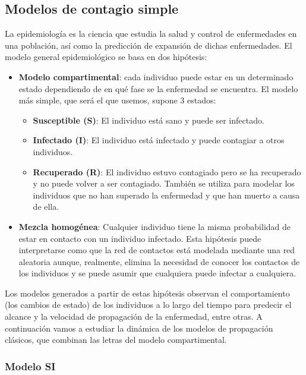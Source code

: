 \documentclass[]{article}
\begin{document}
\subsection{Modelos de contagio
simple}\label{modelos-de-contagio-simple}

La epidemiología es la ciencia que estudia la salud y control de
enfermedades en una población, así como la predicción de expansión de
dichas enfermedades. El modelo general epidemiológico se basa en dos
hipótesis:

\begin{itemize}
\itemsep1pt\parskip0pt
\item
  \textbf{Modelo compartimental}: cada individuo puede estar en un
  determinado estado dependiendo de en qué fase se la enfermedad se
  encuentra. El modelo más simple, que será el que usemos, supone 3
  estados:

  \begin{itemize}
  \itemsep1pt\parskip0pt
  \item
    \textbf{Susceptible (S)}: El individuo está sano y puede ser
    infectado.
  \item
    \textbf{Infectado (I)}: El individuo está infectado y puede
    contagiar a otros individuos.
  \item
    \textbf{Recuperado (R)}: El individuo estuvo contagiado pero se ha
    recuperado y no puede volver a ser contagiado. También se utiliza
    para modelar los individuos que no han superado la enfermedad y que
    han muerto a causa de ella.
  \end{itemize}
\item
  \textbf{Mezcla homogénea}: Cualquier individuo tiene la misma
  probabilidad de estar en contacto con un individuo infectado. Esta
  hipótesis puede interpretarse como que la red de contactos está
  modelada mediante una red aleatoria aunque, realmente, elimina la
  necesidad de conocer los contactos de los individuos y se puede asumir
  que cualquiera puede infectar a cualquiera.
\end{itemize}

Los modelos generados a partir de estas hipótesis observan el
comportamiento (los cambios de estado) de los individuos a lo largo del
tiempo para predecir el alcance y la velocidad de propagación de la
enfermedad, entre otras. A continuación vamos a estudiar la dinámica de
los modelos de propagación clásicos, que combinan las letras del modelo
compartimental.

\subsubsection{Modelo SI}\label{modelo-si}
\end{document}
